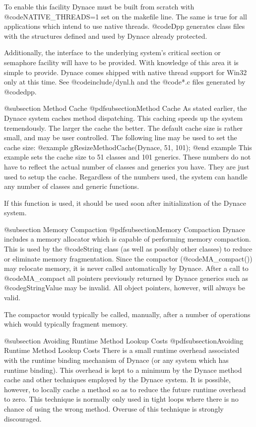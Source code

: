 To enable this facility Dynace must be built from scratch with
@code{NATIVE_THREADS=1} set on the makefile line.  The same is
true for all applications which intend to use native threads.
@code{Dpp} generates class files with the structures defined
and used by Dynace already protected.

Additionally, the interface to the underlying system's critical
section or semaphore facility will have to be provided.  With
knowledge of this area it is simple to provide.  Dynace comes
shipped with native thread support for Win32 only at this time.
See @code{include/dynl.h} and the @code{*.c} files generated by
@code{dpp}.



@subsection Method Cache
@pdfsubsection{Method Cache}
As stated earlier, the Dynace system caches method dispatching.  This
caching speeds up the system tremendously.  The larger the cache the
better.  The default cache size is rather small, and may be user
controlled.  The following line may be used to set the cache size:
@example
        gResizeMethodCache(Dynace, 51, 101);
@end example
This example sets the cache size to 51 classes and 101 generics.  These
numbers do not have to reflect the actual number of classes and generics
you have.  They are just used to setup the cache.  Regardless of the
numbers used, the system can handle any number of classes and generic
functions.

If this function is used, it should be used soon after initialization
of the Dynace system.


@subsection Memory Compaction
@pdfsubsection{Memory Compaction}
Dynace includes a memory allocator which is capable of performing memory
compaction.  This is used by the @code{String} class (as well as
possibly other classes) to reduce or eliminate memory fragmentation.
Since the compactor (@code{MA_compact()}) may relocate memory, it is
never called automatically by Dynace.  After a call to @code{MA_compact}
all pointers previously returned by Dynace generics such as
@code{gStringValue} may be invalid.  All object pointers, however, will
always be valid.

The compactor would typically be called, manually, after a number of
operations which would typically fragment memory.


@subsection Avoiding Runtime Method Lookup Costs
@pdfsubsection{Avoiding Runtime Method Lookup Costs}
There is a small runtime overhead associated with the runtime binding
mechanism of Dynace (or any system which has runtime binding).  This
overhead is kept to a minimum by the Dynace method cache and other techniques
employed by the Dynace system.  It is possible, however, to locally cache
a method so as to reduce the future runtime overhead to zero.  This
technique is normally only used in tight loops where there is no chance
of using the wrong method.  Overuse of this technique is strongly
discouraged.

